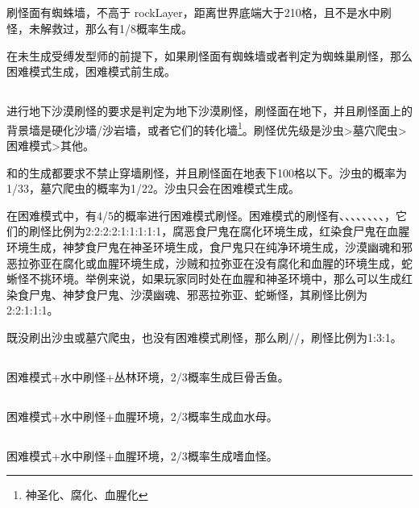 \subsection{}
刷怪面有蜘蛛墙，不高于 rockLayer，距离世界底端大于210格，且不是水中刷怪，未解救过，那么有1/8概率生成。

在未生成受缚发型师的前提下，如果刷怪面有蜘蛛墙或者判定为蜘蛛巢刷怪，那么困难模式生成，困难模式前生成。

\subsection{}
进行地下沙漠刷怪的要求是判定为地下沙漠刷怪，刷怪面在地下，并且刷怪面上的背景墙是硬化沙墙/沙岩墙，或者它们的转化墙\footnote{神圣化、腐化、血腥化}。刷怪优先级是沙虫>墓穴爬虫>困难模式>其他。

和的生成都要求不禁止穿墙刷怪，并且刷怪面在地表下100格以下。沙虫的概率为1/33，墓穴爬虫的概率为1/22。沙虫只会在困难模式生成。

在困难模式中，有4/5的概率进行困难模式刷怪。困难模式的刷怪有、、、、、、、、，它们的刷怪比例为2:2:2:2:1:1:1:1:1，腐恶食尸鬼在腐化环境生成，红染食尸鬼在血腥环境生成，神梦食尸鬼在神圣环境生成，食尸鬼只在纯净环境生成，沙漠幽魂和邪恶拉弥亚在腐化或血腥环境生成，沙贼和拉弥亚在没有腐化和血腥的环境生成，蛇蜥怪不挑环境。举例来说，如果玩家同时处在血腥和神圣环境中，那么可以生成红染食尸鬼、神梦食尸鬼、沙漠幽魂、邪恶拉弥亚、蛇蜥怪，其刷怪比例为2:2:1:1:1。

既没刷出沙虫或墓穴爬虫，也没有困难模式刷怪，那么刷//，刷怪比例为1:3:1。

\subsection{}
困难模式+水中刷怪+丛林环境，2/3概率生成巨骨舌鱼。

\subsection{}
困难模式+水中刷怪+血腥环境，2/3概率生成血水母。

\subsection{}
困难模式+水中刷怪+血腥环境，2/3概率生成嗜血怪。

